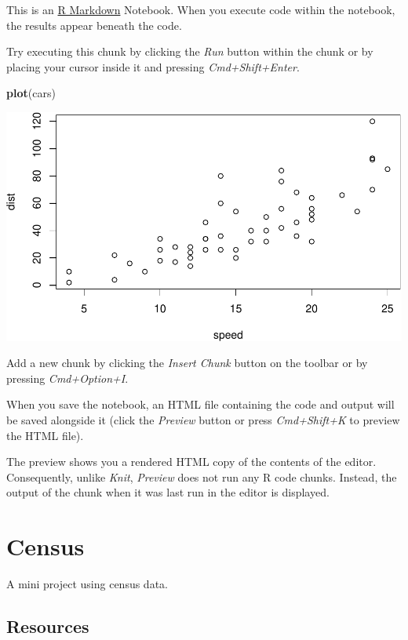 \documentclass[]{book}
\newenvironment{Shaded}{\begin{snugshade}}{\end{snugshade}}
\newcommand{\KeywordTok}[1]{\textcolor[rgb]{0.13,0.29,0.53}{\textbf{#1}}}
\newcommand{\NormalTok}[1]{#1}
\begin{document}
This is an \href{http://rmarkdown.rstudio.com}{R Markdown} Notebook.
When you execute code within the notebook, the results appear beneath
the code.

Try executing this chunk by clicking the \emph{Run} button within the
chunk or by placing your cursor inside it and pressing
\emph{Cmd+Shift+Enter}.

\begin{Shaded}
\begin{Highlighting}[]
\KeywordTok{plot}\NormalTok{(cars)}
\end{Highlighting}
\end{Shaded}

\includegraphics{08-graphics_files/figure-latex/unnamed-chunk-1-1.pdf}

Add a new chunk by clicking the \emph{Insert Chunk} button on the
toolbar or by pressing \emph{Cmd+Option+I}.

When you save the notebook, an HTML file containing the code and output
will be saved alongside it (click the \emph{Preview} button or press
\emph{Cmd+Shift+K} to preview the HTML file).

The preview shows you a rendered HTML copy of the contents of the
editor. Consequently, unlike \emph{Knit}, \emph{Preview} does not run
any R code chunks. Instead, the output of the chunk when it was last run
in the editor is displayed.

\chapter{Census}\label{census}

A mini project using census data.

\section{Resources}\label{resources}
\end{document}
